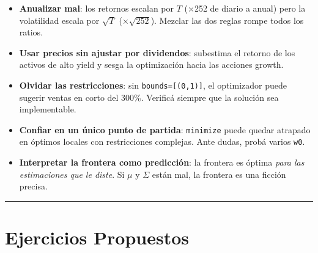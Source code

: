 \documentclass[
  spanish,
  letterpaper,
  DIV=11,
  numbers=noendperiod]{scrreprt}
\providecommand{\tightlist}{%
  \setlength{\itemsep}{0pt}\setlength{\parskip}{0pt}}
\begin{document}
\begin{tcolorbox}[enhanced jigsaw, bottomrule=.15mm, colback=white, opacitybacktitle=0.6, arc=.35mm, toprule=.15mm, opacityback=0, breakable, titlerule=0mm, left=2mm, coltitle=black, colbacktitle=quarto-callout-warning-color!10!white, colframe=quarto-callout-warning-color-frame, leftrule=.75mm, toptitle=1mm, bottomtitle=1mm, title=\textcolor{quarto-callout-warning-color}{\faExclamationTriangle}\hspace{0.5em}{Trampas frecuentes}, rightrule=.15mm]

\begin{itemize}
\tightlist
\item
  \textbf{Anualizar mal}: los retornos escalan por \(T\) (×252 de diario
  a anual) pero la volatilidad escala por \(\sqrt{T}\)
  (×\(\sqrt{252}\)). Mezclar las dos reglas rompe todos los ratios.
\item
  \textbf{Usar precios sin ajustar por dividendos}: subestima el retorno
  de los activos de alto yield y sesga la optimización hacia las
  acciones growth.
\item
  \textbf{Olvidar las restricciones}: sin \texttt{bounds={[}(0,1){]}},
  el optimizador puede sugerir ventas en corto del 300\%. Verificá
  siempre que la solución sea implementable.
\item
  \textbf{Confiar en un único punto de partida}: \texttt{minimize} puede
  quedar atrapado en óptimos locales con restricciones complejas. Ante
  dudas, probá varios \texttt{w0}.
\item
  \textbf{Interpretar la frontera como predicción}: la frontera es
  óptima \emph{para las estimaciones que le diste}. Si \(\mu\) y
  \(\Sigma\) están mal, la frontera es una ficción precisa.
\end{itemize}

\end{tcolorbox}

\begin{center}\rule{0.5\linewidth}{0.5pt}\end{center}

\chapter{Ejercicios Propuestos}\label{ejercicios-propuestos-7}
\end{document}

